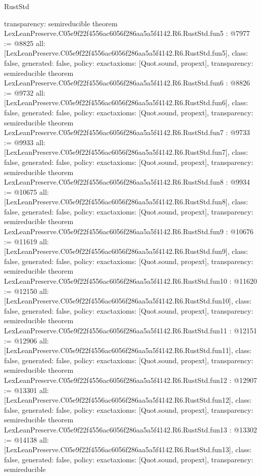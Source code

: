 \begin{lexlean}{RustStd}
\begin{coremodule}
{  transparency: semireducible
}
theorem LexLeanPreserve.C05e9f22f4556ac6056f286aa5a5f4142.R6.RustStd.fun5 : @7977 := @8825 {
  all: [LexLeanPreserve.C05e9f22f4556ac6056f286aa5a5f4142.R6.RustStd.fun5],
  class: false,
  generated: false,
  policy: exact{axioms: [Quot.sound, propext]},
  transparency: semireducible
}
theorem LexLeanPreserve.C05e9f22f4556ac6056f286aa5a5f4142.R6.RustStd.fun6 : @8826 := @9732 {
  all: [LexLeanPreserve.C05e9f22f4556ac6056f286aa5a5f4142.R6.RustStd.fun6],
  class: false,
  generated: false,
  policy: exact{axioms: [Quot.sound, propext]},
  transparency: semireducible
}
theorem LexLeanPreserve.C05e9f22f4556ac6056f286aa5a5f4142.R6.RustStd.fun7 : @9733 := @9933 {
  all: [LexLeanPreserve.C05e9f22f4556ac6056f286aa5a5f4142.R6.RustStd.fun7],
  class: false,
  generated: false,
  policy: exact{axioms: [Quot.sound, propext]},
  transparency: semireducible
}
theorem LexLeanPreserve.C05e9f22f4556ac6056f286aa5a5f4142.R6.RustStd.fun8 : @9934 := @10675 {
  all: [LexLeanPreserve.C05e9f22f4556ac6056f286aa5a5f4142.R6.RustStd.fun8],
  class: false,
  generated: false,
  policy: exact{axioms: [Quot.sound, propext]},
  transparency: semireducible
}
theorem LexLeanPreserve.C05e9f22f4556ac6056f286aa5a5f4142.R6.RustStd.fun9 : @10676 := @11619 {
  all: [LexLeanPreserve.C05e9f22f4556ac6056f286aa5a5f4142.R6.RustStd.fun9],
  class: false,
  generated: false,
  policy: exact{axioms: [Quot.sound, propext]},
  transparency: semireducible
}
theorem LexLeanPreserve.C05e9f22f4556ac6056f286aa5a5f4142.R6.RustStd.fun10 : @11620 := @12150 {
  all: [LexLeanPreserve.C05e9f22f4556ac6056f286aa5a5f4142.R6.RustStd.fun10],
  class: false,
  generated: false,
  policy: exact{axioms: [Quot.sound, propext]},
  transparency: semireducible
}
theorem LexLeanPreserve.C05e9f22f4556ac6056f286aa5a5f4142.R6.RustStd.fun11 : @12151 := @12906 {
  all: [LexLeanPreserve.C05e9f22f4556ac6056f286aa5a5f4142.R6.RustStd.fun11],
  class: false,
  generated: false,
  policy: exact{axioms: [Quot.sound, propext]},
  transparency: semireducible
}
theorem LexLeanPreserve.C05e9f22f4556ac6056f286aa5a5f4142.R6.RustStd.fun12 : @12907 := @13301 {
  all: [LexLeanPreserve.C05e9f22f4556ac6056f286aa5a5f4142.R6.RustStd.fun12],
  class: false,
  generated: false,
  policy: exact{axioms: [Quot.sound, propext]},
  transparency: semireducible
}
theorem LexLeanPreserve.C05e9f22f4556ac6056f286aa5a5f4142.R6.RustStd.fun13 : @13302 := @14138 {
  all: [LexLeanPreserve.C05e9f22f4556ac6056f286aa5a5f4142.R6.RustStd.fun13],
  class: false,
  generated: false,
  policy: exact{axioms: [Quot.sound, propext]},
  transparency: semireducible
}
\end{coremodule}
\end{lexlean}
